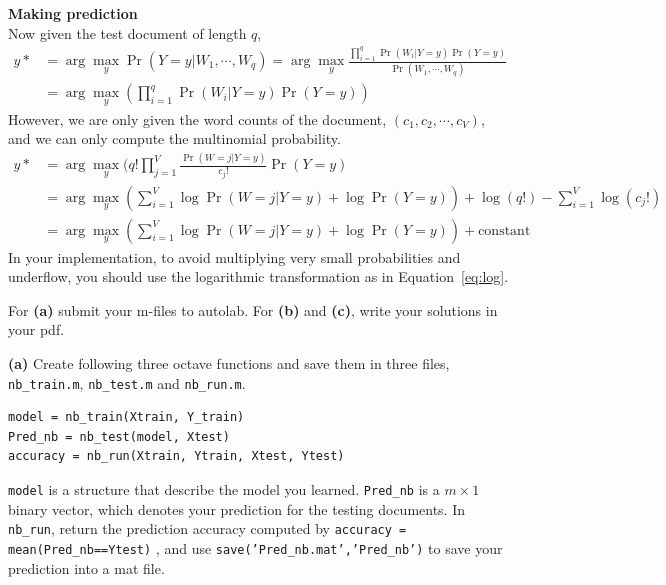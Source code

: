 \documentclass[11pt]{article}
\renewcommand{\part}[1] {\vspace{.10in} {\bf (#1)}}
\begin{document}
\begin{enumerate}
\textbf{Making prediction}\\
Now given the test document of length $q$, 
\begin{align*}
y* &= \arg\max_y \Pr(Y = y |W_1, \cdots, W_q)  = \arg\max_y \frac{ \prod_{i=1}^{q} \Pr( W_i| Y = y) \Pr( Y = y)}{ \Pr (W_1, \cdots, W_q)} \\
& = \arg\max_y (\prod_{i=1}^{q} \Pr( W_i| Y = y) \Pr( Y = y)) 
\end{align*}
However, we are only given the word counts of the document, $(c_1, c_2, \cdots, c_V)$,  and we can only compute the multinomial probability.
\begin{align}
y* &= \arg\max_y (  q! \prod_{j = 1}^{V} \frac{\Pr(W = j| Y=y)} {c_j!} \Pr( Y = y) \\ 
   & = \arg\max_y (\sum_{i=1}^{V} \log \Pr(W = j| Y=y) + \log \Pr(Y= y)) + \log (q!) - \sum_{i=1}^{V}\log(c_j!) \\ 
   & = \arg\max_y (\sum_{i=1}^{V} \log \Pr(W = j| Y=y) + \log \Pr(Y= y)) + \text{constant} \label{eq:log}
\end{align}
In your implementation, to avoid multiplying very small probabilities 
and underflow, you should use the logarithmic transformation 
as in Equation~\ref{eq:log}. 
\end{enumerate}
 
For \part{a}  submit your m-files to autolab. 
For \part{b} and \part{c}, write your solutions in your pdf. 


\part{a} Create following three octave functions and save them in three 
files, \texttt{nb\_train.m}, \texttt{nb\_test.m} and \texttt{nb\_run.m}.
\begin{verbatim}
model = nb_train(Xtrain, Y_train)
Pred_nb = nb_test(model, Xtest)
accuracy = nb_run(Xtrain, Ytrain, Xtest, Ytest)
\end{verbatim}
\texttt{model} is a structure that describe the model you learned. 
\texttt{Pred\_nb} is a $m\times 1$ binary vector, which denotes your prediction for the testing documents. 
In \texttt{nb\_run}, return the prediction accuracy  computed by \texttt{accuracy = mean(Pred\_nb==Ytest)} , and use \texttt{save('Pred\_nb.mat','Pred\_nb')} to save your prediction into a 
mat file. \\
\end{document}
